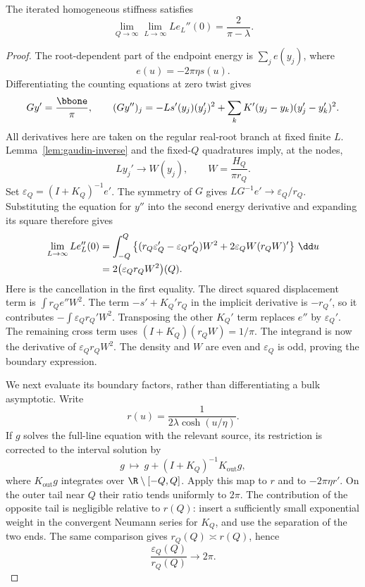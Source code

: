 \begin{lemma}\label{lem:stiffness}
The iterated homogeneous stiffness satisfies
\begin{equation}\label{eq:stiffness-value}
 \lim_{Q\to\infty}\lim_{L\to\infty}L e_L''(0)
      =\frac2{\pi-\lambda}.
\end{equation}
\end{lemma}
\begin{proof}
The root-dependent part of the endpoint energy is
\(\sum_j e(y_j)\), where
\[
 e(u)=-2\pi\eta s(u).
\]
Differentiating the counting equations at zero twist gives
\[
 G y'=\frac{\bbone}{\pi},\qquad
 (G y'')_j=-L s'(y_j)(y'_j)^2
      +\sum_kK'(y_j-y_k)(y'_j-y'_k)^2.
\]
All derivatives here are taken on the regular real-root branch at fixed
finite \(L\). Lemma~\ref{lem:gaudin-inverse} and the fixed-\(Q\) quadratures
imply, at the nodes,
\[
 L y_j'\longrightarrow W(y_j),\qquad
 W=\frac{H_Q}{\pi r_Q}.
\]
Set \(\varepsilon_Q=(I+K_Q)^{-1}e'\).
The symmetry of \(G\) gives
\(L G^{-1}e'\to\varepsilon_Q/r_Q\).
Substituting the equation for \(y''\) into the second energy derivative
and expanding its square therefore gives
\begin{align}
 \lim_{L\to\infty}L e_L''(0)
 &=\int_{-Q}^{Q}
   \left\{(r_Q\varepsilon_Q'-\varepsilon_Qr_Q')W^2
       +2\varepsilon_Q W(r_QW)'\right\}\,\dd u \notag\\
 &=2\bigl(\varepsilon_Qr_QW^2\bigr)(Q).
 \label{eq:stiffness-boundary}
\end{align}
Here is the cancellation in the first equality. The direct squared
displacement term is \(\int r_Q e''W^2\).
The term \(-s'+K_Q'r_Q\) in the implicit derivative is
\(-r_Q'\), so it contributes \(-\int\varepsilon_Qr_Q'W^2\).
Transposing the other \(K_Q'\) term replaces \(e''\) by
\(\varepsilon_Q'\). The remaining cross term uses
\((I+K_Q)(r_QW)=1/\pi\).
The integrand is now the derivative of
\(\varepsilon_Qr_QW^2\). The density and \(W\) are even and
\(\varepsilon_Q\) is odd, proving the boundary expression.

We next evaluate its boundary factors, rather than differentiating a
bulk asymptotic. Write
\[
 r(u)=\frac1{2\lambda\cosh(u/\eta)}.
\]
If \(g\) solves the full-line equation with the relevant source, its
restriction is corrected to the interval solution by
\[
 g\ \longmapsto\
 g+(I+K_Q)^{-1}K_{\mathrm{out}}g,
\]
where \(K_{\mathrm{out}}g\) integrates over \(\R\setminus[-Q,Q]\).
Apply this map to \(r\) and to \(-2\pi\eta r'\).
On the outer tail near \(Q\) their ratio tends uniformly to \(2\pi\).
The contribution of the opposite tail is negligible relative to \(r(Q)\):
insert a sufficiently small exponential weight in the convergent Neumann
series for \(K_Q\), and use the separation of the two ends.
The same comparison gives \(r_Q(Q)\asymp r(Q)\), hence
\[
 \frac{\varepsilon_Q(Q)}{r_Q(Q)}\longrightarrow2\pi.
\]


\end{proof}
